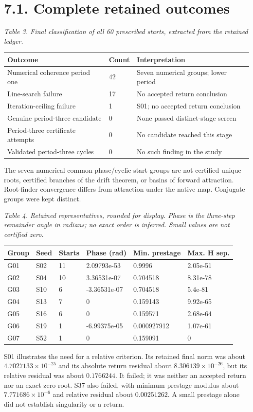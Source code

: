 \documentclass[11pt,a4paper]{article}
\begin{document}
\clearpage
\section*{7.1. Complete retained outcomes}
\par\textit{Table 3. Final classification of all 60 prescribed starts, extracted from the retained ledger.}
\begingroup\small
\begin{tabularx}{\textwidth}{XXX}
\toprule
Outcome & Count & Interpretation\\\midrule
Numerical coherence period one & 42 & Seven numerical groups; lower period\\
Line-search failure & 17 & No accepted return conclusion\\
Iteration-ceiling failure & 1 & S01; no accepted return conclusion\\
Genuine period-three candidate & 0 & None passed distinct-stage screen\\
Period-three certificate attempts & 0 & No candidate reached this stage\\
Validated period-three cycles & 0 & No such finding in the study\\
\bottomrule\end{tabularx}\endgroup\par
The seven numerical common-phase/cyclic-start groups are not certified unique roots, certified branches of the drift theorem, or basins of forward attraction. Root-finder convergence differs from attraction under the native map. Conjugate groups were kept distinct. \cite{D03}

\par\textit{Table 4. Retained representatives, rounded for display. Phase is the three-step remainder angle in radians; no exact order is inferred. Small values are not certified zero.}
\begingroup\small
\begin{tabularx}{\textwidth}{XXXXXX}
\toprule
Group & Seed & Starts & Phase (rad) & Min. prestage & Max. H sep.\\\midrule
G01 & S02 & 11 & 2.09793e-53 & 0.9996 & 2.05e-51\\
G02 & S04 & 10 & 3.36531e-07 & 0.704518 & 8.31e-78\\
G03 & S10 & 6 & -3.36531e-07 & 0.704518 & 5.4e-81\\
G04 & S13 & 7 & 0 & 0.159143 & 9.92e-65\\
G05 & S16 & 6 & 0 & 0.159571 & 2.68e-64\\
G06 & S19 & 1 & -6.99375e-05 & 0.000927912 & 1.07e-61\\
G07 & S52 & 1 & 0 & 0.159091 & 0\\
\bottomrule\end{tabularx}\endgroup\par
S01 illustrates the need for a relative criterion. Its retained final norm was about $4.7027133\times10^{-25}$ and its absolute return residual about $8.306139\times10^{-26}$, but its relative residual was about $0.1766244$. It failed; it was neither an accepted return nor an exact zero root. S37 also failed, with minimum prestage modulus about $7.771686\times10^{-6}$ and relative residual about $0.00251262$. A small prestage alone did not establish singularity or a return.
\end{document}
